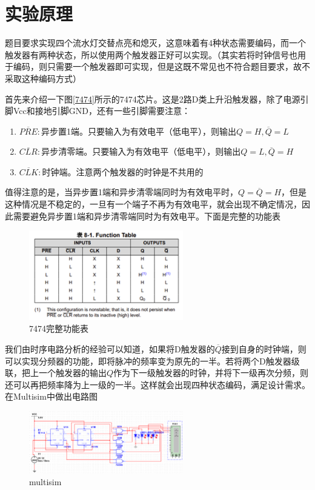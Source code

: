 \documentclass{ctexart}
\begin{document}
\section{实验原理}
题目要求实现四个流水灯交替点亮和熄灭，这意味着有4种状态需要编码，而一个触发器有两种状态，所以使用两个触发器正好可以实现。（其实若将时钟信号也用于编码，则只需要一个触发器即可实现，但是这既不常见也不符合题目要求，故不采取这种编码方式）

首先来介绍一下图\ref*{7474}所示的7474芯片。这是2路D类上升沿触发器，除了电源引脚Vcc和接地引脚GND，还有一些引脚需要注意：
\begin{enumerate}
    \item $\overline{PRE}:$异步置1端。只要输入为有效电平（低电平），则输出$Q=H,\overline{Q}=L$
    \item $\overline{CLR}:$异步清零端。只要输入为有效电平（低电平），则输出$Q=L,\overline{Q}=H$
    \item $\overline{CLK}:$时钟端。注意两个触发器的时钟是不共用的
\end{enumerate}
值得注意的是，当异步置1端和异步清零端同时为有效电平时，$Q=\overline{Q}=H$，但是这种情况是不稳定的，一旦有一个端子不再为有效电平，就会出现不确定情况，因此需要避免异步置1端和异步清零端同时为有效电平。下面是完整的功能表
\begin{figure}[H]
    \centering
    \includegraphics[width=0.6\textwidth]{7474真值表.png}
    \caption{7474完整功能表}
\end{figure}
我们由时序电路分析的经验可以知道，如果将D触发器的$\overline{Q}$接到自身的时钟端，则可以实现分频器的功能，即将脉冲的频率变为原先的一半。若将两个D触发器级联，把上一个触发器的输出$Q$作为下一级触发器的时钟，并将下一级再次分频，则还可以再把频率降为上一级的一半。这样就会出现四种状态编码，满足设计需求。在Multisim中做出电路图
\begin{figure}[H]
    \centering
    \includegraphics[width=0.6\textwidth]{multisim.png}
    \caption{multisim}
    \label{multisim}
\end{figure}
\end{document}
